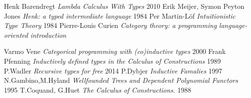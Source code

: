 \documentclass[11pt,oneside]{article}
\begin{document}
\begin{thebibliography}{9}

      Henk Barendregt \textit{Lambda Calculus With Types} 2010
       Erik Meijer, Symon Peyton Jones \textit{Henk: a typed intermediate language} 1984
        Per Martin-Löf \textit{Intuitionistic Type Theory} 1984
    Pierre-Louis Curien \textit{Category theory: a programming language-oriented introduction}


       Varmo Vene \textit{Categorical programming with (co)inductive types} 2000
   Frank Pfenning \textit{Inductively defined types in the Calculus of Constructions} 1989
  P.Wadler \textit{Recursive types for free} 2014 %
       P.Dybjer \textit{Inductive Famalies} 1997
      N.Gambino,M.Hyland \textit{Wellfounded Trees and Dependent Polynomial Functors} 1995
    T.Coquand, G.Huet \textit{The Calculus of Constructions.} 1988

\end{thebibliography}
\end{document}
